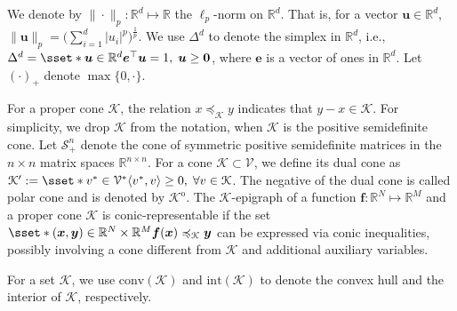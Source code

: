 \documentclass[final,onefignum,onetabnum]{class}
\newcommand{\bs}[1]{\boldsymbol{#1}} %
\newcommand{\Bs}[1]{\mathbb{#1}} %
\newcommand{\Cs}[1]{\mathcal{#1}} %
\newcommand{\conv}[1]{\text{conv}(#1)}
\newcommand{\inte}[1]{\text{int}\left(#1\right)}
\newcommand{\polar}[1]{\Cs{#1}^{\mathrm{o}}}
\newcommand{\dual}[1]{\Cs{#1}^{\prime}}
\begin{document}
We denote by $\|\cdot\|_{p}: \Bs{R}^{d} \mapsto \Bs{R}$ the $\ell_{p}$-norm on $\Bs{R}^{d}$. That is, for a vector $\bs{u} \in \Bs{R}^{d}$, $\|\bs{u}\|_{p}=\Big( \sum_{i=1}^{d} |u_{i}|^{p} \Big)^{\frac{1}{p}}$. %
We use $\Delta^{d}$ to denote the simplex in $\Bs{R}^{d}$, i.e., $\Delta^{d}=\sset*{\bs{u} \in \Bs{R}^{d}}{\bs{e}^{\top}\bs{u}=1, \; \bs{u} \ge \bs{0}}$, where $\bs{e}$ is a vector of ones in $\Bs{R}^{d}$. 
Let $(\cdot)_{+}$ denote $\max\{0,\cdot\}$. 

For a proper cone $\Cs{K}$, the relation $x \preccurlyeq_{\Cs{K}} y$ indicates that $y-x \in \Cs{K}$. For simplicity, we drop $\Cs{K}$ from the notation, when $\Cs{K}$ is the positive semidefinite cone. Let $\Cs{S}_{+}^{n}$ denote the cone of symmetric positive semidefinite matrices in the $n \times n$ matrix spaces $\Bs{R}^{n \times n}$. For a cone $\Cs{K} \subset \Cs{V}$, we define its dual cone as $\dual{K}:=\sset*{v^{*} \in \Cs{V}^{*}}{\langle v^{*},v \rangle \ge 0, \; \forall v \in \Cs{K} }$. The negative of the dual cone is called polar cone and is denoted by $\polar{K}$. 
The $\Cs{K}$-epigraph of a function $\bs{f}: \Bs{R}^{N} \mapsto \Bs{R}^{M}$ and a proper
cone $\Cs{K}$ is conic-representable if the set  $\sset*{(\bs{x},\bs{y}) \in \Bs{R}^{N}\times \Bs{R}^{M}}{\bs{f}(\bs{x}) \preccurlyeq_{\Cs{K}} \bs{y}}$ can be expressed via conic inequalities,
possibly involving a cone different from $\Cs{K}$ and additional
auxiliary variables.

For a set $\Cs{K}$, we use  $\conv{\Cs{K}}$ and $\inte{\Cs{K}}$ to denote the convex hull and the interior of $\Cs{K}$, respectively. 
\end{document}
